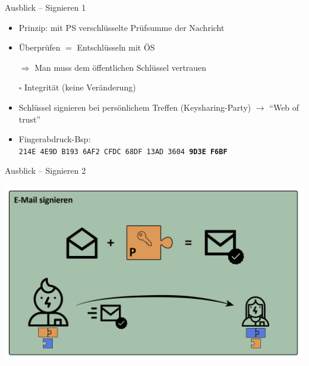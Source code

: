\documentclass{beamer}
\begin{document}
\begin{frame}{Ausblick – Signieren 1}
  
  \begin{itemize}
   \item Prinzip: mit PS verschlüsselte Prüfsumme der Nachricht
   \item Überprüfen $=$ Entschlüsseln mit ÖS
   \item[$\Rightarrow$] Man muss dem öffentlichen Schlüssel vertrauen\\[2mm]
   \item[$\square$\hspace{-.67em}\raisebox{0.1em}{\scalebox{1.3}{\checkmark}}] Integrität (keine Veränderung)
   \pause
   
   \item Schlüssel signieren bei persönlichem Treffen (Keysharing-Party) $\rightarrow$ "`Web of trust"'
   \item Fingerabdruck-Bsp:\\
   \texttt{214E 4E9D B193 6AF2 CFDC 68DF 13AD 3604 \textbf{9D3E F6BF}}
  \end{itemize}

\end{frame}


\begin{frame}{Ausblick – Signieren 2}
  \begin{center}
  \includegraphics[width=.9\textwidth]{img-src/pgp_sig.png}
  \end{center}
\end{frame}

\end{document}
